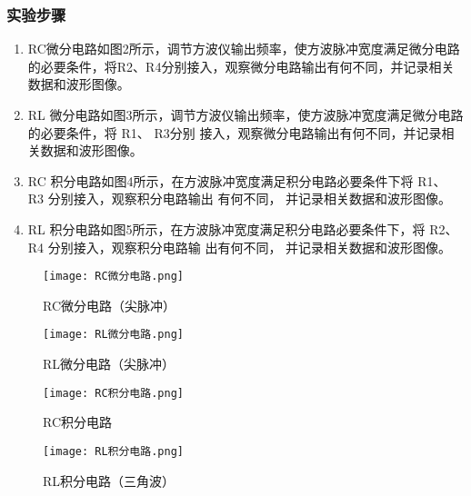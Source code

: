 \documentclass[dvipsnames, svgnames,a4paper,11pt]{article}
\begin{document}
	\subsubsection{实验步骤}
\begin{enumerate}
	 \item  RC微分电路如图2所示，调节方波仪输出频率，使方波脉冲宽度满足微分电路的必要条件，将R2、R4分别接入，观察微分电路输出有何不同，并记录相关数据和波形图像。
	 \item RL 微分电路如图3所示，调节方波仪输出频率，使方波脉冲宽度满足微分电路的必要条件，将 R1、 R3分别
	 接入，观察微分电路输出有何不同，并记录相关数据和波形图像。
	 \item RC 积分电路如图4所示，在方波脉冲宽度满足积分电路必要条件下将 R1、 R3 分别接入，观察积分电路输出
	 有何不同， 并记录相关数据和波形图像。
	 \item RL 积分电路如图5所示，在方波脉冲宽度满足积分电路必要条件下，将 R2、 R4 分别接入，观察积分电路输
	 出有何不同， 并记录相关数据和波形图像。
	\end{enumerate}
	 \begin{figure}[H]
		\begin{minipage}[b]{0.5\linewidth}
		  \centering
		  \texttt{[image: RC微分电路.png]}
		  \caption{RC微分电路（尖脉冲）}
		\end{minipage}
		\hfill
		\begin{minipage}[b]{0.5\linewidth}
		  \centering
		  \texttt{[image: RL微分电路.png]}
		  \caption{RL微分电路（尖脉冲）}
		\end{minipage}
	 \end{figure}
	 \begin{figure}[H]
		\begin{minipage}[b]{0.5\linewidth}
		  \centering
		  \texttt{[image: RC积分电路.png]}
		  \caption{RC积分电路}
		\end{minipage}
		\hfill
		\begin{minipage}[b]{0.5\linewidth}
		  \centering
		  \texttt{[image: RL积分电路.png]}
		  \caption{RL积分电路（三角波）}
		\end{minipage}
	 \end{figure}
	 

\end{document}
